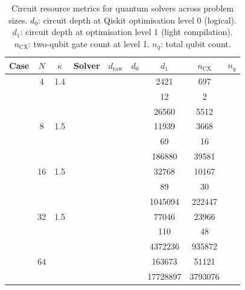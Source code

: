 \begin{table}[htbp]
  \centering
  \caption{Circuit resource metrics for quantum solvers across problem sizes. $d_0$: circuit depth at Qiskit optimisation level 0 (logical). $d_1$: circuit depth at optimisation level 1 (light compilation). $n_\mathrm{CX}$: two-qubit gate count at level 1. $n_q$: total qubit count.}
  \label{tab:circuit_resources}
  \begin{tabular}{l S[table-format=3.0] S[table-format=4.1] l S[table-format=6.0] S[table-format=6.0] S[table-format=6.0] S[table-format=5.0] S[table-format=2.0]}
    \toprule
    {Case} & {$N$} & {$\kappa$} & {Solver} & {$d_\mathrm{raw}$} & {$d_0$} & {$d_1$} & {$n_\mathrm{CX}$} & {$n_q$} \\
    \midrule
     & 4 & 1.4 &  & {\text{---}} & {\text{---}} & 2421 & 697 & {\text{---}} \\
     &  &  &  & {\text{---}} & {\text{---}} & 12 & 2 & {\text{---}} \\
     &  &  &  & {\text{---}} & {\text{---}} & 26560 & 5512 & {\text{---}} \\
     & 8 & 1.5 &  & {\text{---}} & {\text{---}} & 11939 & 3668 & {\text{---}} \\
     &  &  &  & {\text{---}} & {\text{---}} & 69 & 16 & {\text{---}} \\
     &  &  &  & {\text{---}} & {\text{---}} & 186880 & 39581 & {\text{---}} \\
     & 16 & 1.5 &  & {\text{---}} & {\text{---}} & 32768 & 10167 & {\text{---}} \\
     &  &  &  & {\text{---}} & {\text{---}} & 89 & 30 & {\text{---}} \\
     &  &  &  & {\text{---}} & {\text{---}} & 1045094 & 222447 & {\text{---}} \\
     & 32 & 1.5 &  & {\text{---}} & {\text{---}} & 77046 & 23966 & {\text{---}} \\
     &  &  &  & {\text{---}} & {\text{---}} & 110 & 48 & {\text{---}} \\
     &  &  &  & {\text{---}} & {\text{---}} & 4372236 & 935872 & {\text{---}} \\
     & 64 & {\text{---}} &  & {\text{---}} & {\text{---}} & 163673 & 51121 & {\text{---}} \\
     &  &  &  & {\text{---}} & {\text{---}} & 17728897 & 3793076 & {\text{---}} \\

\end{tabular}
\end{table}
